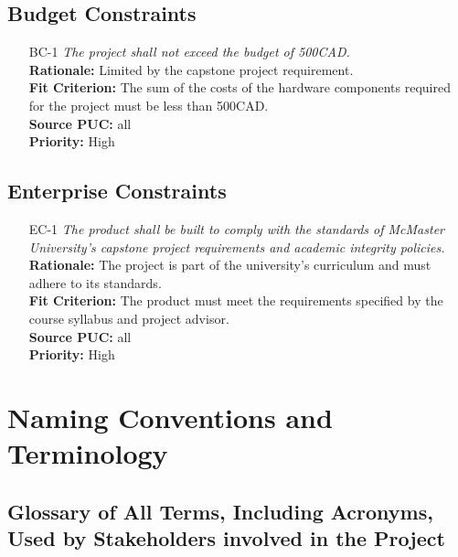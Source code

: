 \documentclass[12pt]{article}
\begin{document}
\subsection{Budget Constraints}

\begin{itemize}[leftmargin=*]
  \item[BC-1] \emph{The project shall not exceed the budget of 500CAD.}\\[2mm]
        \textbf{Rationale:} Limited by the capstone project requirement.\\
        \textbf{Fit Criterion:} The sum of the costs of the hardware components required for the project must be less than 500CAD.\\
        \textbf{Source PUC:} all\\
        \textbf{Priority:} High
\end{itemize}

\subsection{Enterprise Constraints}

\begin{itemize}[leftmargin=*]
  \item[EC-1] \emph{The product shall be built to comply with the standards of McMaster
          University's capstone project requirements and academic integrity policies.}\\[2mm]
        \textbf{Rationale:} The project is part of the university's curriculum and must adhere to its standards.\\
        \textbf{Fit Criterion:} The product must meet the requirements specified by the course syllabus and project advisor.\\
        \textbf{Source PUC:} all\\
        \textbf{Priority:} High
\end{itemize}

\section{Naming Conventions and Terminology}
\subsection{Glossary of All Terms, Including Acronyms, Used by Stakeholders
  involved in the Project}
\end{document}
